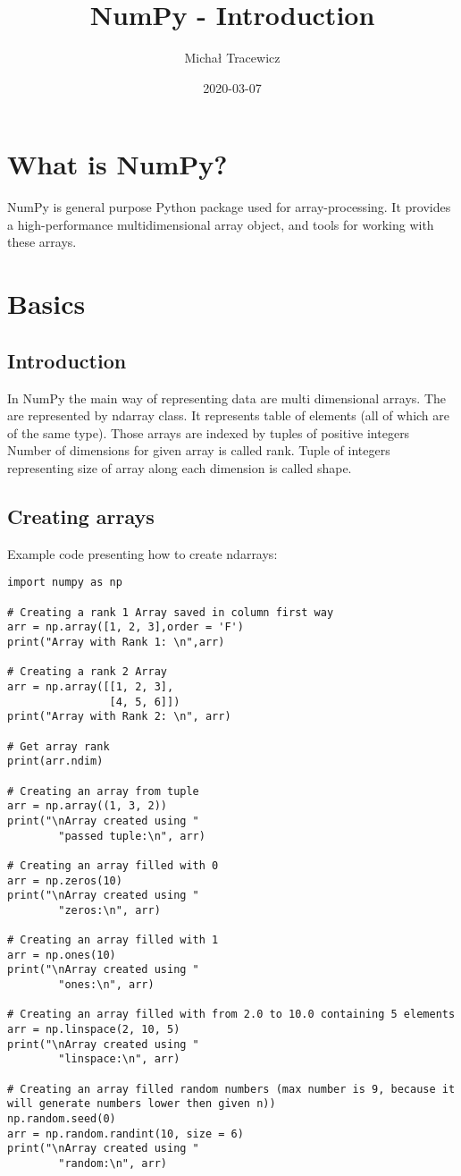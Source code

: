 \documentclass{article}
\title{NumPy - Introduction}
\author{Michał Tracewicz}
\date{2020-03-07}
\begin{document}
\maketitle
\newpage
\tableofcontents
\newpage
{}
\section{What is NumPy?}
NumPy is general purpose Python package used for array-processing.
It provides a high-performance multidimensional array object, and tools for working with these arrays.
\section{Basics}
\subsection{Introduction}
In NumPy the main way of representing data are multi dimensional arrays.
The are represented by ndarray class. It represents table of elements (all of which are of the same type).
Those arrays are indexed by tuples of positive integers
Number of dimensions for given array is called rank.
Tuple of integers representing size of array along each dimension is called shape.
\subsection{Creating arrays}
Example code presenting how to create ndarrays:
\begin{lstlisting}
import numpy as np

# Creating a rank 1 Array saved in column first way
arr = np.array([1, 2, 3],order = 'F')
print("Array with Rank 1: \n",arr)

# Creating a rank 2 Array
arr = np.array([[1, 2, 3],
                [4, 5, 6]])
print("Array with Rank 2: \n", arr)

# Get array rank
print(arr.ndim)

# Creating an array from tuple
arr = np.array((1, 3, 2))
print("\nArray created using "
        "passed tuple:\n", arr)

# Creating an array filled with 0
arr = np.zeros(10)
print("\nArray created using "
        "zeros:\n", arr)

# Creating an array filled with 1
arr = np.ones(10)
print("\nArray created using "
        "ones:\n", arr)

# Creating an array filled with from 2.0 to 10.0 containing 5 elements
arr = np.linspace(2, 10, 5)
print("\nArray created using "
        "linspace:\n", arr)

# Creating an array filled random numbers (max number is 9, because it will generate numbers lower then given n))
np.random.seed(0)
arr = np.random.randint(10, size = 6)
print("\nArray created using "
        "random:\n", arr)
\end{lstlisting}
\end{document}
